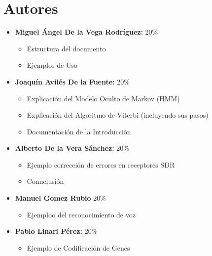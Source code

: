 \documentclass[11pt,openany]{book}
\begin{document}
\tableofcontents %
\newpage %


\chapter{Autores}
\begin{itemize}
      \item \textbf{Miguel Ángel De la Vega Rodríguez:} 20\%
            \begin{itemize}
                  \item Estructura del documento
                  \item Ejemplos de Uso
            \end{itemize}
      \item \textbf{Joaquín Avilés De la Fuente:} 20\%
            \begin{itemize}
                  \item Explicación del Modelo Oculto de Markov (HMM)
                  \item Explicación del Algoritmo de Viterbi (incluyendo sus pasos)
                  \item Documentación de la Introducción
            \end{itemize}
      \item \textbf{Alberto De la Vera Sánchez: } 20\%
            \begin{itemize}
                  \item Ejemplo corrección de errores en receptores SDR
                  \item Connclusión
            \end{itemize}
      \item \textbf{Manuel Gomez Rubio} 20\%
            \begin{itemize}
                \item Ejemploo del reconocimiento de voz
            \end{itemize}
      \item \textbf{Pablo Linari Pérez:} 20\%
            \begin{itemize}
                  \item Ejemplo de Codificación de Genes
            \end{itemize}
\end{itemize}
\end{document}
